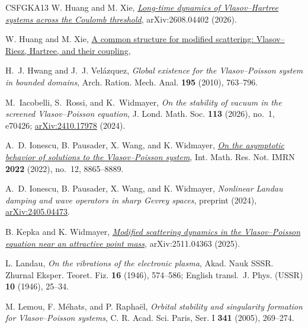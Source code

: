\documentclass[10pt,reqno]{amsart}
\theoremstyle{definition}
\begin{document}
{\begin{thebibliography}{CSFGKA13}
W. Huang and M. Xie,
\href{https://arxiv.org/abs/2608.04402}{\emph{Long-time dynamics of Vlasov--Hartree systems across the Coulomb threshold}},
arXiv:2608.04402 (2026).

W. Huang and M. Xie,
\href{https://arxiv.org/abs/2610.02643}{A common structure for modified scattering: Vlasov--Riesz, Hartree, and their coupling},


H.~J. Hwang and J.~J. Vel\'azquez,
\emph{Global existence for the Vlasov--Poisson system in bounded domains},
Arch. Ration. Mech. Anal. \textbf{195} (2010), 763--796.

M.~Iacobelli, S.~Rossi, and K.~Widmayer,
\emph{On the stability of vacuum in the screened Vlasov--Poisson equation},
J. Lond. Math. Soc. \textbf{113} (2026), no.~1, e70426; \href{https://arxiv.org/abs/2410.17978}{arXiv:2410.17978} (2024).



A.~D. Ionescu, B. Pausader, X. Wang, and K. Widmayer,
\href{https://doi.org/10.1093/imrn/rnab155}{\emph{On the asymptotic behavior of solutions to the Vlasov--Poisson system}},
Int. Math. Res. Not. IMRN \textbf{2022} (2022), no.~12, 8865--8889.





A.~D. Ionescu, B. Pausader, X. Wang, and K. Widmayer,
\emph{Nonlinear Landau damping and wave operators in sharp Gevrey spaces},
preprint (2024), \href{https://arxiv.org/abs/2405.04473}{arXiv:2405.04473}.











B. Kepka and K. Widmayer,
\href{https://arxiv.org/abs/2511.04363}{\emph{Modified scattering dynamics in the Vlasov--Poisson equation near an attractive point mass}},
arXiv:2511.04363 (2025).

L. Landau,
\emph{On the vibrations of the electronic plasma},
Akad. Nauk SSSR. Zhurnal Eksper. Teoret. Fiz. \textbf{16} (1946), 574--586; English transl.\ J. Phys. (USSR) \textbf{10} (1946), 25--34.




M. Lemou, F. M\'ehats, and P. Rapha\"el,
\emph{Orbital stability and singularity formation for Vlasov--Poisson systems},
C. R. Acad. Sci. Paris, Ser. I \textbf{341} (2005), 269--274.











\end{thebibliography}}
\end{document}
